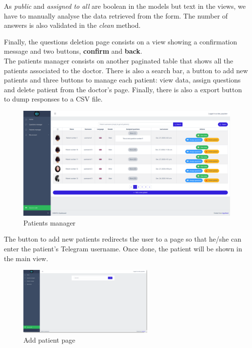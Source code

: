 \documentclass[12pt,english]{article}
\begin{document}
As \emph{public} and \emph{assigned to all} are boolean in the models but text in the views, we have to manually analyse the data retrieved from the form. The number of answers is also validated in the \emph{clean} method.

Finally, the questions deletion page consists on a view showing a confirmation message and two buttons, \textbf{confirm} and \textbf{back}.
\\

The patients manager consists on another paginated table that shows all the patients associated to the doctor. There is also a search bar, a button to add new patients and three buttons to manage each patient: view data, assign questions and delete patient from the doctor's page. Finally, there is also a export button to dump responses to a CSV file.

\begin{figure}[H]
  \centering
    \includegraphics[width=\textwidth]{patients_manager.png}
  \caption{Patients manager}
\end{figure}

The button to add new patients redirects the user to a page so that he/she can enter the patient's Telegram username. Once done, the patient will be shown in the main view.

\begin{figure}[H]
  \centering
    \includegraphics[width=0.6\textwidth]{add_patient.png}
  \caption{Add patient page}
\end{figure}
\end{document}
